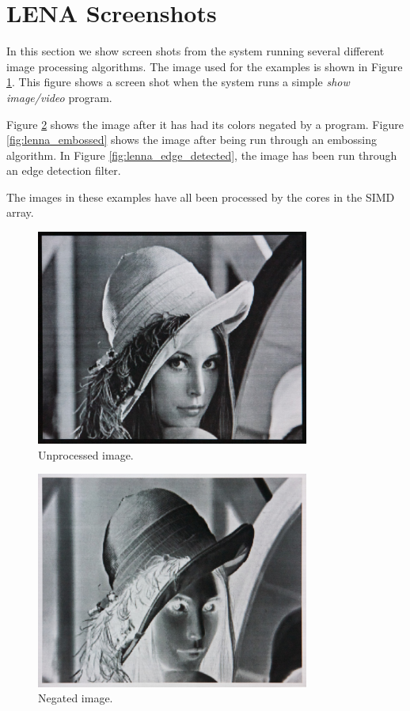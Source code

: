 \section{LENA Screenshots}

In this section we show screen shots from the system running several
different image processing algorithms. The image used for the examples
is shown in Figure \ref{fig:lenna_unprocessed}. This figure shows a
screen shot when the system runs a simple \emph{show image/video}
program.

Figure \ref{fig:lenna_negated} shows the image after it has had its
colors negated by a program. Figure \ref{fig:lenna_embossed} shows the
image after being run through an embossing algorithm. In Figure
\ref{fig:lenna_edge_detected}, the image has been run through an edge
detection filter.

The images in these examples have all been processed by the cores in the
SIMD array.

\clearpage
\begin{figure}[h]
  \centering
  \includegraphics[width=0.8\textwidth]{gfx/results/lenna_unprocessed}
  \caption{Unprocessed image.}
  \label{fig:lenna_unprocessed}
\end{figure}

\begin{figure}[h]
  \centering
  \includegraphics[width=0.8\textwidth]{gfx/results/lenna_negated}
  \caption{Negated image.}
  \label{fig:lenna_negated}
\end{figure}

